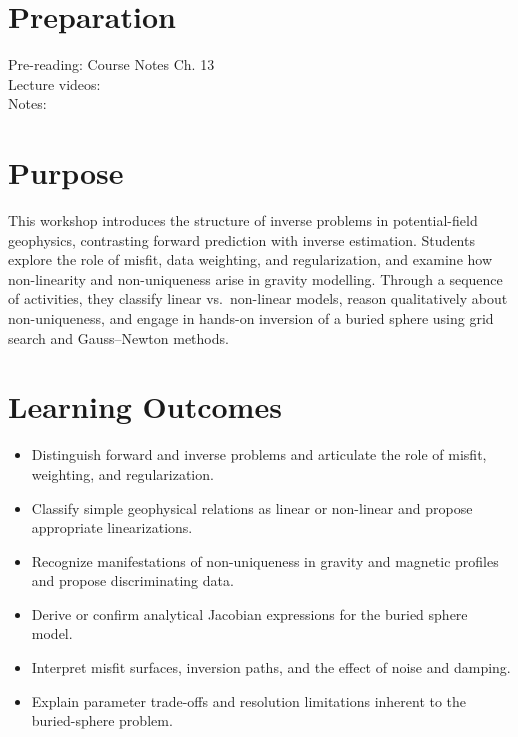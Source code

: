 
\workshopstart

\vspace{-0.75em}
\section*{Preparation}

\begin{description}
  \item[Pre-reading: Course Notes Ch. 13]
  \item[Lecture videos:]
  \item[Notes:]
\end{description}

\section*{Purpose}
This workshop introduces the structure of inverse problems in potential-field geophysics, contrasting forward prediction with inverse estimation. Students explore the role of misfit, data weighting, and regularization, and examine how non-linearity and non-uniqueness arise in gravity modelling. Through a sequence of activities, they classify linear vs.\ non-linear models, reason qualitatively about non-uniqueness, and engage in hands-on inversion of a buried sphere using grid search and Gauss--Newton methods.

\section*{Learning Outcomes}
\begin{itemize}
  \item Distinguish forward and inverse problems and articulate the role of misfit, weighting, and regularization.
  \item Classify simple geophysical relations as linear or non-linear and propose appropriate linearizations.
  \item Recognize manifestations of non-uniqueness in gravity and magnetic profiles and propose discriminating data.
  \item Derive or confirm analytical Jacobian expressions for the buried sphere model.
  \item Interpret misfit surfaces, inversion paths, and the effect of noise and damping.
  \item Explain parameter trade-offs and resolution limitations inherent to the buried-sphere problem.
\end{itemize}

